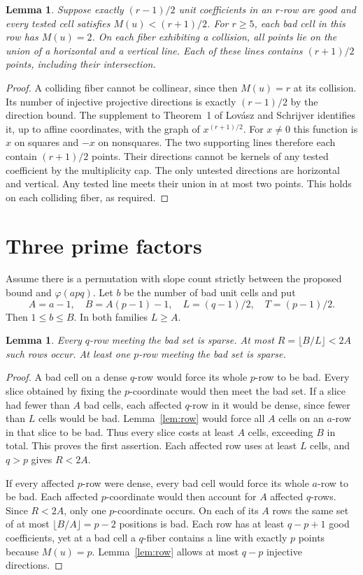 \documentclass[11pt,a4paper]{article}
\newtheorem{lemma}[theorem]{Lemma}
\begin{document}
\begin{lemma}\label{lem:half}
Suppose exactly $(r-1)/2$ unit coefficients in an $r$-row are good and every tested cell satisfies $M(u)<(r+1)/2$. For $r\ge5$, each bad cell in this row has $M(u)=2$. On each fiber exhibiting a collision, all points lie on the union of a horizontal and a vertical line. Each of these lines contains $(r+1)/2$ points, including their intersection.
\end{lemma}
\begin{proof}
A colliding fiber cannot be collinear, since then $M(u)=r$ at its collision. Its number of injective projective directions is exactly $(r-1)/2$ by the direction bound. The supplement to Theorem~1 of Lov\'asz and Schrijver \cite{directions} identifies it, up to affine coordinates, with the graph of $x^{(r+1)/2}$. For $x\ne0$ this function is $x$ on squares and $-x$ on nonsquares. The two supporting lines therefore each contain $(r+1)/2$ points. Their directions cannot be kernels of any tested coefficient by the multiplicity cap. The only untested directions are horizontal and vertical. Any tested line meets their union in at most two points. This holds on each colliding fiber, as required.
\end{proof}

\section{Three prime factors}
Assume there is a permutation with slope count strictly between the proposed bound and $\varphi(apq)$. Let $b$ be the number of bad unit cells and put
\[
 A=a-1,\quad B=A(p-1)-1,\quad L=(q-1)/2,\quad T=(p-1)/2.
\]
Then $1\le b\le B$. In both families $L\ge A$.

\begin{lemma}\label{lem:three}
Every $q$-row meeting the bad set is sparse. At most $R=\lfloor B/L\rfloor<2A$ such rows occur. At least one $p$-row meeting the bad set is sparse.
\end{lemma}
\begin{proof}
A bad cell on a dense $q$-row would force its whole $p$-row to be bad. Every slice obtained by fixing the $p$-coordinate would then meet the bad set. If a slice had fewer than $A$ bad cells, each affected $q$-row in it would be dense, since fewer than $L$ cells would be bad. Lemma~\ref{lem:row} would force all $A$ cells on an $a$-row in that slice to be bad. Thus every slice costs at least $A$ cells, exceeding $B$ in total. This proves the first assertion. Each affected row uses at least $L$ cells, and $q>p$ gives $R<2A$.

If every affected $p$-row were dense, every bad cell would force its whole $a$-row to be bad. Each affected $p$-coordinate would then account for $A$ affected $q$-rows. Since $R<2A$, only one $p$-coordinate occurs. On each of its $A$ rows the same set of at most $\lfloor B/A\rfloor=p-2$ positions is bad. Each row has at least $q-p+1$ good coefficients, yet at a bad cell a $q$-fiber contains a line with exactly $p$ points because $M(u)=p$. Lemma~\ref{lem:row} allows at most $q-p$ injective directions.
\end{proof}
\end{document}

